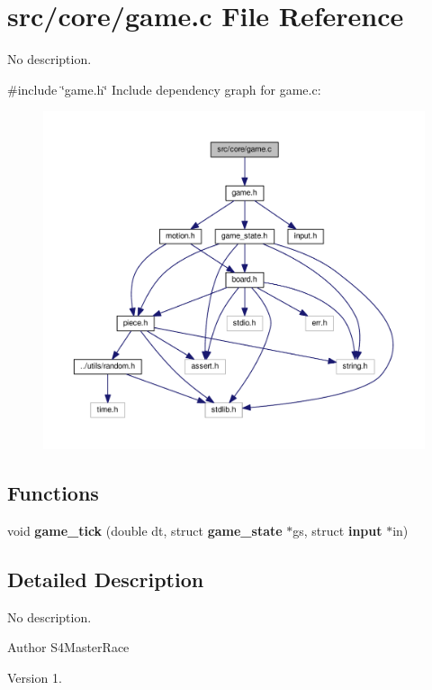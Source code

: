 \section{src/core/game.c File Reference}
\label{game_8c}


No description.  


{\ttfamily \#include \char`\"{}game.\+h\char`\"{}}\newline
Include dependency graph for game.\+c\+:
\nopagebreak
\begin{figure}[H]
\begin{center}
\leavevmode
\includegraphics[width=350pt]{game_8c__incl}
\end{center}
\end{figure}
\subsection*{Functions}
\begin{DoxyCompactItemize}
\item 
void \textbf{ game\+\_\+tick} (double dt, struct \textbf{ game\+\_\+state} $\ast$gs, struct \textbf{ input} $\ast$in)
\end{DoxyCompactItemize}


\subsection{Detailed Description}
No description. 

\begin{DoxyAuthor}{Author}
S4\+Master\+Race 
\end{DoxyAuthor}
\begin{DoxyVersion}{Version}
1. 
\end{DoxyVersion}


